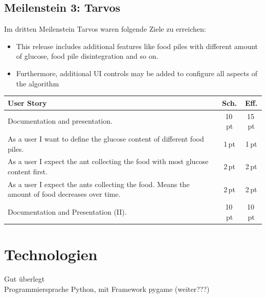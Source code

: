 \vspace*{2cm}



\subsection{Meilenstein 3: Tarvos}

Im dritten Meilenstein Tarvos waren folgende Ziele zu erreichen:

\begin{itemize}[noitemsep]
\item This release includes additional features like food piles with different amount of glucose, food pile disintegration and so on.
\item Furthermore, additional UI controls may be added to configure all aspects of the algorithm
\end{itemize}


\begin{table}[H]
\small\sffamily\renewcommand{\arraystretch}{1.5}
\begin{tabular}{| p{12cm} | c | c |}
  \hline
  \bfseries{User Story} & \bfseries{Sch.} & \bfseries{Eff.}  \\
  \hline
  Documentation and presentation. & 10\,pt & 15\,pt \\
  \hline
  As a user I want to define the glucose content of different food piles. & 1\,pt &1\,pt \\
  \hline
  As a user I expect the ant collecting the food with most glucose content first. & 2\,pt &2\,pt \\
  \hline
  As a user I expect the ants collecting the food. Means the amount of food decreases over time. & 2\,pt & 2\,pt \\
  \hline
  Documentation and Presentation (II). & 10\,pt & 10\,pt \\
  \hline
\end{tabular}
\end{table}

\vspace*{2cm}


\vspace*{1cm}


\section{Technologien}

Gut überlegt \\

Programmiersprache Python, mit Framework pygame (weiter???)

